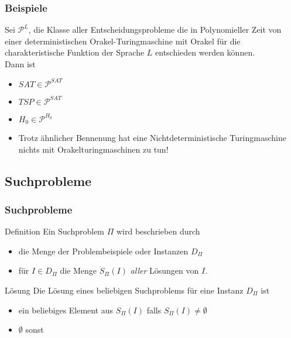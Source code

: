 \documentclass{beamer}
\begin{document}
{\begin{frame}
\frametitle{Beispiele}
Sei $\mathcal{P}^L$, die Klasse aller Entscheidungsprobleme die in Polynomieller Zeit von einer deterministischen Orakel-Turingmaschine mit Orakel für die charakteristische Funktion der Sprache $L$ entschieden werden können.\\
Dann ist
\begin{itemize}
\item $SAT \in \mathcal{P}^{SAT}$
\item $TSP \in \mathcal{P}^{SAT}$ 
\item $H_0 \in \mathcal{P}^{H_0}$
\item Trotz ähnlicher Bennenung hat eine Nichtdeterministische Turingmaschine nichts mit Orakelturingmaschinen zu tun!
\end{itemize}
\end{frame}


\subsection{Suchprobleme}
\begin{frame}
 \frametitle{Suchprobleme}
 \begin{block}{Definition}
  Ein Suchproblem $\Pi$ wird beschrieben durch
  \begin{itemize}
   \item die Menge der Problembeispiele oder Instanzen $D_\Pi$
   \item für $I\in D_\Pi$ die Menge $S_\Pi(I)$ \emph{aller} Lösungen von $I$.
  \end{itemize}
 \end{block}
\begin{block}{Lösung}
 Die Lösung eines beliebigen Suchproblems für eine Instanz $D_\Pi$ ist
 \begin{itemize}
  \item ein beliebiges Element aus $S_\Pi(I)$ falls $S_\Pi(I) \not = \emptyset$
  \item $\emptyset$ sonst
 \end{itemize}
\end{block}
\end{frame}

}
\end{document}
